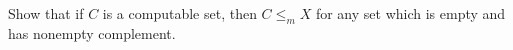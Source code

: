\begin{problem}
  Show that if $C$ is a computable set, then $C \leq_m X$ for any set
  which is empty and has nonempty complement.

  \begin{answer}
    
  \end{answer}
\end{problem}
